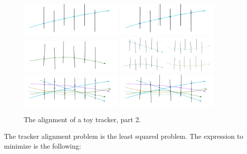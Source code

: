 \begin{figure}[htb]
    \begin{center}
        \includegraphics[width=0.45\textwidth]{../figs/Alignment/toyTracker07.png}
        \includegraphics[width=0.45\textwidth]{../figs/Alignment/toyTracker08.png}
        \includegraphics[width=0.45\textwidth]{../figs/Alignment/toyTracker09.png}
        \includegraphics[width=0.45\textwidth]{../figs/Alignment/toyTracker10.png}
        \includegraphics[width=0.45\textwidth]{../figs/Alignment/toyTracker12.png}
        \includegraphics[width=0.45\textwidth]{../figs/Alignment/toyTracker13.png}
    \end{center}
    \caption{The alignment of a toy tracker, part 2.}
    \label{fig:toyTracker_part2}
\end{figure}


The tracker alignment problem is the least squared problem. The expression to minimize is the following:

